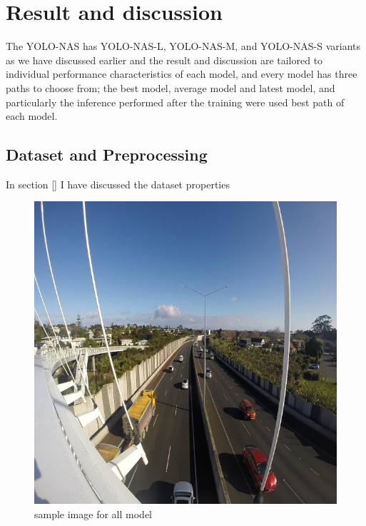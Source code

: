 \section{Result and discussion}
The YOLO-NAS has YOLO-NAS-L, YOLO-NAS-M, and YOLO-NAS-S variants as we have discussed earlier and the result and discussion are tailored to individual performance characteristics of each model, and every model has three paths to choose from; the best model, average model and latest model, and particularly  the inference performed after the training were used best path of each model.
\subsection{Dataset and Preprocessing}
In section [] I have discussed the dataset properties
\begin{figure}[H]
    \centering
    \includegraphics[width=\linewidth]{tex/img/sample_dataset.jpg}
    \caption{sample image for all model}
    \label{fig:sample_dataset}
\end{figure}
